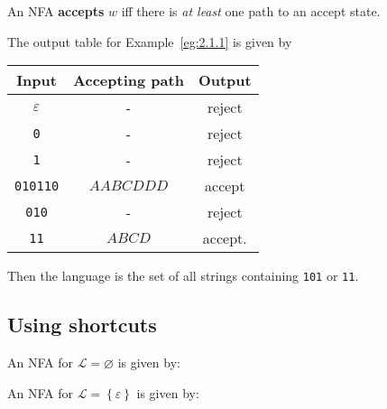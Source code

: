 \documentclass{notes}
\begin{document}
\begin{defn}
  An NFA {\boldmath \bfseries accepts} $w$ iff there is \textit{at least} one path to an accept state.
\end{defn}

\begin{eg}
  The output table for Example~\ref{eg:2.1.1} is given by 
  \begin{center}
    \begin{tabular}{ccc}
      Input & Accepting path & Output \\ 
      \hline
      $\varepsilon$ & - & reject \\ 
      \verb~0~ & - & reject \\ 
      \verb~1~ & - & reject \\ 
      \verb~010110~ & $AABCDDD$ & accept \\
      \verb~010~ & - & reject \\ 
      \verb~11~ & $ABCD$ & accept. 
    \end{tabular}
  \end{center}
  
  Then the language is the set of all strings containing \verb~101~ or \verb~11~.
\end{eg}

\newpage

\subsection{Using shortcuts}

\begin{eg}
  An NFA for $\mathcal L = \varnothing$ is given by: 
  
  \begin{center}
  \end{center}
\end{eg}

\begin{eg}
  An NFA for $\mathcal L = \left \{ \varepsilon \right \}$ is given by: 

  \begin{center}
  \end{center}
\end{eg}
\end{document}
